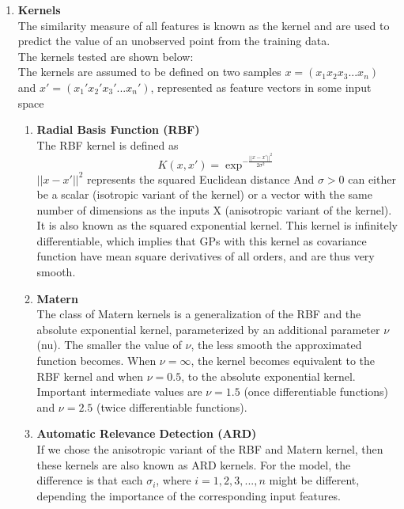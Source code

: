 \documentclass{article}
\begin{document}
\begin{enumerate}
		\item \textbf{Kernels}\\
		The similarity measure of all features is known as the kernel and are used to predict the value of an unobserved point from the training data. \\

		The kernels tested are shown below:\\
		The kernels are assumed to be defined on two samples \( x = ( x_{1} x_{2} x_{3} ... x_{n} ) \) and 
		\( x' = ( {x_{1}}' {x_{2}}' {x_{3}}' ... {x_{n}}')\),  
		represented as feature vectors in some input space\\

		\begin{enumerate}
			\item \textbf{Radial Basis Function (RBF)}\\
			The RBF kernel is defined as 
			\begin{equation}\label{eq:kernel_rbf}
				K(x,x') = \exp^{-\frac{||x-x'||^{2}}{2\sigma^{2}}}
			\end{equation}
			\(||x-x'||^{2}\) represents the squared Euclidean distance 
			And \( \sigma > 0 \) can either be a scalar (isotropic variant of the kernel) or a vector with the same number of dimensions 
			as the inputs X (anisotropic variant of the kernel). \\
			It is also known as the squared exponential kernel. This kernel is infinitely differentiable, 
			which implies that GPs with this kernel as covariance function have mean square derivatives of all orders, 
			and are thus very smooth.
			
			\item \textbf{Matern}\\
			The class of Matern kernels is a generalization of the RBF and the absolute exponential kernel, parameterized 
			by an additional parameter $\nu$ (nu). The smaller the value of $\nu$, the less smooth the approximated function becomes. When $\nu=\infty$, 
			the kernel becomes equivalent to the RBF kernel and when $\nu=0.5$, to the absolute exponential kernel. 
			Important intermediate values are $\nu=1.5$ (once differentiable functions) and $\nu=2.5$ (twice differentiable functions).

			\item \textbf{Automatic Relevance Detection (ARD)}\\
			If we chose the anisotropic variant of the RBF and Matern kernel, then these kernels are also known as ARD kernels. For the model, the difference is that each \(\sigma_{i}\), where $i = 1,2,3,...,n$ might be different, depending the importance of the corresponding input features.\\


\end{enumerate}
\end{enumerate}
\end{document}
